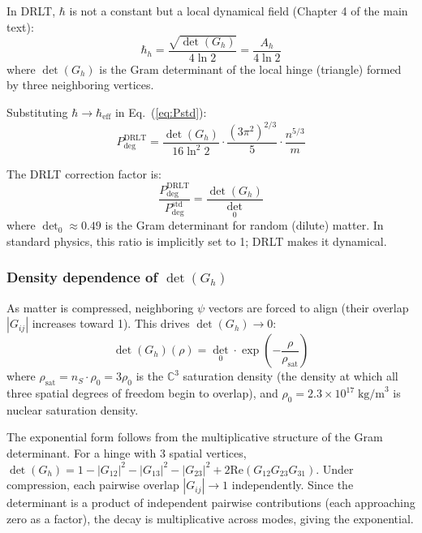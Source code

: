 \documentclass[12pt]{article}
\theoremstyle{remark}
\theoremstyle{definition}
\newcommand{\CC}{\mathbb{C}}
\begin{document}
In DRLT, $\hbar$ is not a constant but a local dynamical field (Chapter 4 of the main text):
\begin{equation}
\hbar_h = \frac{\sqrt{\det(G_h)}}{4\ln 2} = \frac{A_h}{4\ln 2}
\end{equation}
where $\det(G_h)$ is the Gram determinant of the local hinge (triangle) formed by three neighboring vertices.

Substituting $\hbar \to \hbar_\text{eff}$ in Eq.~(\ref{eq:Pstd}):
\begin{equation}
\boxed{P_\text{deg}^\text{DRLT} = \frac{\det(G_h)}{16\ln^2 2} \cdot \frac{(3\pi^2)^{2/3}}{5} \cdot \frac{n^{5/3}}{m}}
\label{eq:Pdrlt}
\end{equation}

The DRLT correction factor is:
\begin{equation}
\frac{P_\text{deg}^\text{DRLT}}{P_\text{deg}^\text{std}} = \frac{\det(G_h)}{\det_0}
\end{equation}
where $\det_0 \approx 0.49$ is the Gram determinant for random (dilute) matter. In standard physics, this ratio is implicitly set to 1; DRLT makes it dynamical.

\subsubsection{Density dependence of $\det(G_h)$}

As matter is compressed, neighboring $\psi$ vectors are forced to align (their overlap $|G_{ij}|$ increases toward 1). This drives $\det(G_h) \to 0$:
\begin{equation}
\det(G_h)(\rho) = \det_0 \cdot \exp\!\left(-\frac{\rho}{\rho_\text{sat}}\right)
\label{eq:det_rho}
\end{equation}
where $\rho_\text{sat} = n_S \cdot \rho_0 = 3\rho_0$ is the $\CC^3$ saturation density (the density at which all three spatial degrees of freedom begin to overlap), and $\rho_0 = 2.3 \times 10^{17}\;\text{kg/m}^3$ is nuclear saturation density.

The exponential form follows from the multiplicative structure of the Gram determinant. For a hinge with 3 spatial vertices, $\det(G_h) = 1 - |G_{12}|^2 - |G_{13}|^2 - |G_{23}|^2 + 2\text{Re}(G_{12}G_{23}G_{31})$. Under compression, each pairwise overlap $|G_{ij}| \to 1$ independently. Since the determinant is a product of independent pairwise contributions (each approaching zero as a factor), the decay is multiplicative across modes, giving the exponential.
\end{document}

